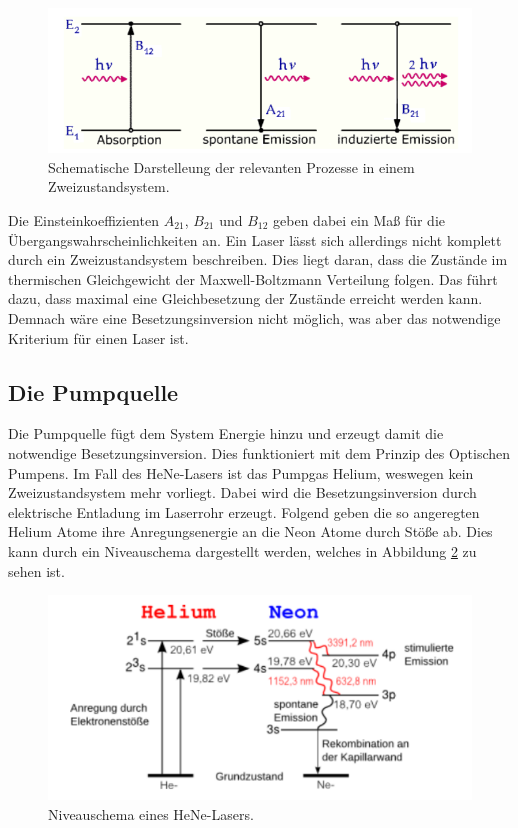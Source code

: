 \begin{figure}[H]
    \centering
    \includegraphics[scale=0.5]{content/prozesse.png}
    \caption{Schematische Darstelleung der relevanten Prozesse in einem Zweizustandsystem. \cite{prozess}}
    \label{fig:prozesse}
\end{figure}

Die Einsteinkoeffizienten $A_{21}$, $B_{21}$ und $B_{12}$ geben dabei ein Maß für die Übergangswahrscheinlichkeiten
an. 
Ein Laser lässt sich allerdings nicht komplett durch ein Zweizustandsystem beschreiben. Dies liegt daran, dass die Zustände
im thermischen Gleichgewicht der Maxwell-Boltzmann Verteilung folgen. Das führt dazu, dass maximal eine Gleichbesetzung der 
Zustände erreicht werden kann. Demnach wäre eine Besetzungsinversion nicht möglich, was aber das notwendige Kriterium für einen
Laser ist. 

\subsection{Die Pumpquelle}

Die Pumpquelle fügt dem System Energie hinzu und erzeugt damit die notwendige Besetzungsinversion. Dies funktioniert mit dem 
Prinzip des Optischen Pumpens. Im Fall des HeNe-Lasers ist das Pumpgas Helium, weswegen kein Zweizustandsystem mehr vorliegt. 
Dabei wird die Besetzungsinversion durch elektrische Entladung im Laserrohr erzeugt. Folgend geben die so angeregten Helium Atome 
ihre Anregungsenergie an die Neon Atome durch Stöße ab. Dies kann durch ein Niveauschema dargestellt werden, welches in 
Abbildung \ref{fig:pump} zu sehen ist. 

\begin{figure}[H]
    \centering
    \includegraphics[scale=0.5]{content/pump.png}
    \caption{Niveauschema eines HeNe-Lasers. \cite{Zeugs}}
    \label{fig:pump}
\end{figure}

